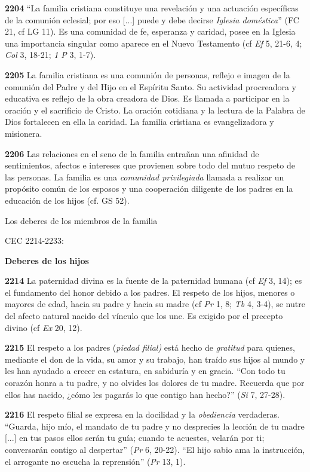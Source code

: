 \documentclass[]{article}
\begin{document}
\textbf{2204} ``La familia cristiana constituye una revelación y una
actuación específicas de la comunión eclesial; por eso {[}...{]} puede y
debe decirse \emph{Iglesia doméstica}'' (FC 21, cf LG 11). Es una
comunidad de fe, esperanza y caridad, posee en la Iglesia una
importancia singular como aparece en el Nuevo Testamento (cf \emph{Ef}
5, 21-6, 4; \emph{Col} 3, 18-21; \emph{1 P} 3, 1-7).

\textbf{2205} La familia cristiana es una comunión de personas, reflejo
e imagen de la comunión del Padre y del Hijo en el Espíritu Santo. Su
actividad procreadora y educativa es reflejo de la obra creadora de
Dios. Es llamada a participar en la oración y el sacrificio de Cristo.
La oración cotidiana y la lectura de la Palabra de Dios fortalecen en
ella la caridad. La familia cristiana es evangelizadora y misionera.

\textbf{2206} Las relaciones en el seno de la familia entrañan una
afinidad de sentimientos, afectos e intereses que provienen sobre todo
del mutuo respeto de las personas. La familia es una \emph{comunidad
privilegiada} llamada a realizar un propósito común de los esposos y una
cooperación diligente de los padres en la educación de los hijos (cf. GS
52).

Los deberes de los miembros de la familia 

CEC 2214-2233:

\textbf{Deberes de los hijos}

\textbf{2214} La paternidad divina es la fuente de la paternidad humana
(cf \emph{Ef} 3, 14); es el fundamento del honor debido a los padres. El
respeto de los hijos, menores o mayores de edad, hacia su padre y hacia
su madre (cf \emph{Pr} 1, 8; \emph{Tb} 4, 3-4), se nutre del afecto
natural nacido del vínculo que los une. Es exigido por el precepto
divino (cf \emph{Ex} 20, 12).

\textbf{2215} El respeto a los padres (\emph{piedad filial)} está hecho
de \emph{gratitud} para quienes, mediante el don de la vida, su amor y
su trabajo, han traído sus hijos al mundo y les han ayudado a crecer en
estatura, en sabiduría y en gracia. ``Con todo tu corazón honra a tu
padre, y no olvides los dolores de tu madre. Recuerda que por ellos has
nacido, ¿cómo les pagarás lo que contigo han hecho?'' (\emph{Si} 7,
27-28).

\textbf{2216} El respeto filial se expresa en la docilidad y la
\emph{obediencia} verdaderas. ``Guarda, hijo mío, el mandato de tu padre
y no desprecies la lección de tu madre {[}...{]} en tus pasos ellos
serán tu guía; cuando te acuestes, velarán por ti; conversarán contigo
al despertar'' (\emph{Pr} 6, 20-22). ``El hijo sabio ama la instrucción,
el arrogante no escucha la reprensión'' (\emph{Pr} 13, 1).
\end{document}
